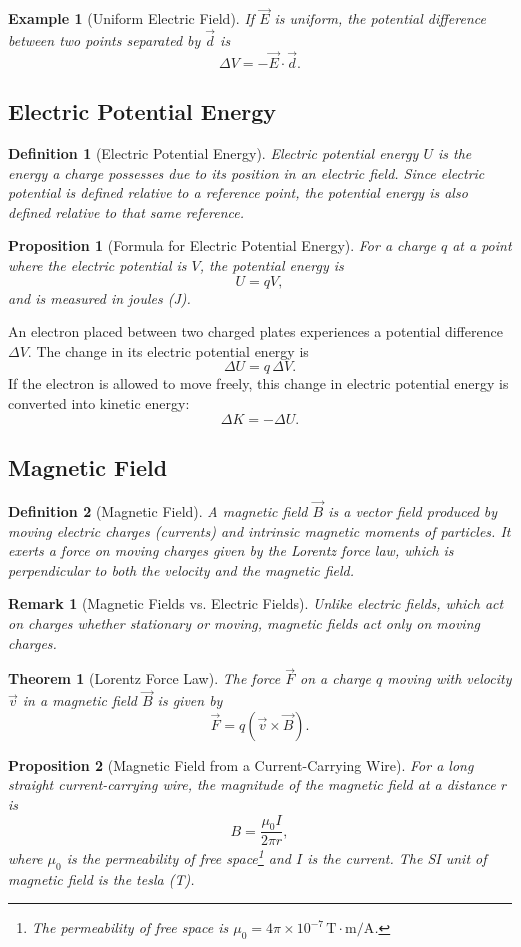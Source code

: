 \documentclass{article}
\newtheorem{theorem}{Theorem}
\newtheorem{definition}{Definition}
\newtheorem*{example}{Example}
\newtheorem{remark}{Remark}
\newtheorem{proposition}{Proposition}
\begin{document}
\begin{example}[Uniform Electric Field]
    If $\vec{E}$ is uniform, the potential difference between two points separated by $\vec{d}$ is
    \[\Delta V = -\vec{E} \cdot \vec{d}.\]
\end{example}

\subsection{Electric Potential Energy}
\begin{definition}[Electric Potential Energy]
    Electric potential energy $U$ is the energy a charge possesses due to its position in an electric field. Since electric potential is defined relative to a reference point, the potential energy is also defined relative to that same reference.
\end{definition}
\begin{proposition}[Formula for Electric Potential Energy]
    For a charge $q$ at a point where the electric potential is $V$, the potential energy is
    \[U = qV,\]
    and is measured in joules (J).
\end{proposition}
An electron placed between two charged plates experiences a potential difference $\Delta V$. The change in its electric potential energy is
\[\Delta U = q\,\Delta V.\]
If the electron is allowed to move freely, this change in electric potential energy is converted into kinetic energy:
\[\Delta K = -\Delta U.\]

\subsection{Magnetic Field}
\begin{definition}[Magnetic Field]
    A magnetic field $\vec{B}$ is a vector field produced by moving electric charges (currents) and intrinsic magnetic moments of particles. It exerts a force on moving charges given by the Lorentz force law, which is perpendicular to both the velocity and the magnetic field.
\end{definition}
\begin{remark}[Magnetic Fields vs. Electric Fields]
    Unlike electric fields, which act on charges whether stationary or moving, magnetic fields act only on moving charges.
\end{remark}
\begin{theorem}[Lorentz Force Law]
    The force $\vec{F}$ on a charge $q$ moving with velocity $\vec{v}$ in a magnetic field $\vec{B}$ is given by
    \[\vec{F} = q(\vec{v} \times \vec{B}).\]
\end{theorem}
\begin{proposition}[Magnetic Field from a Current-Carrying Wire]
    For a long straight current-carrying wire, the magnitude of the magnetic field at a distance $r$ is
    \[B = \frac{\mu_0 I}{2\pi r},\]
    where $\mu_0$ is the permeability of free space\footnote{The permeability of free space is $\mu_0 = 4\pi \times 10^{-7}\,\mathrm{T} \cdot \mathrm{m/A}$.} and $I$ is the current. The SI unit of magnetic field is the tesla (T).
\end{proposition}
\end{document}
